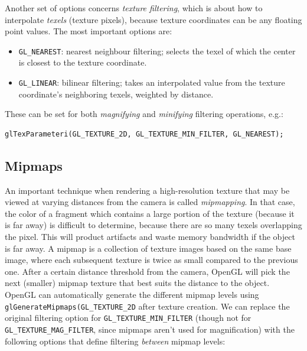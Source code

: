 \documentclass[table, xcdraw]{article}%
\begin{document}
Another set of options concerns \emph{texture filtering}, which is about how to interpolate \emph{texels} (texture pixels), because texture coordinates can be any floating point values. The most important options are:

\begin{itemize}
    \item \texttt{GL_NEAREST}: nearest neighbour filtering; selects the texel of which the center is closest to the texture coordinate.
    \item \texttt{GL_LINEAR}: bilinear filtering; takes an interpolated value from the texture coordinate's neighboring texels, weighted by distance.
\end{itemize}

These can be set for both \emph{magnifying} and \emph{minifying} filtering operations, e.g.:

\begin{verbatim}
glTexParameteri(GL_TEXTURE_2D, GL_TEXTURE_MIN_FILTER, GL_NEAREST);
\end{verbatim}

\subsection{Mipmaps}

An important technique when rendering a high-resolution texture that may be viewed at varying distances from the camera is called \emph{mipmapping}. In that case, the color of a fragment which contains a large portion of the texture (because it is far away) is difficult to determine, because there are so many texels overlapping the pixel. This will product artifacts and waste memory bandwidth if the object is far away. A mipmap is a collection of texture images based on the same base image, where each subsequent texture is twice as small compared to the previous one. After a certain distance threshold from the camera, OpenGL will pick the next (smaller) mipmap texture that best suits the distance to the object. OpenGL can automatically generate the different mipmap levels using \texttt{glGenerateMipmaps(GL_TEXTURE_2D} after texture creation. We can replace the original filtering option for \texttt{GL_TEXTURE_MIN_FILTER} (though not for \texttt{GL_TEXTURE_MAG_FILTER}, since mipmaps aren't used for magnification) with the following options that define filtering \textit{between} mipmap levels:
\end{document}
